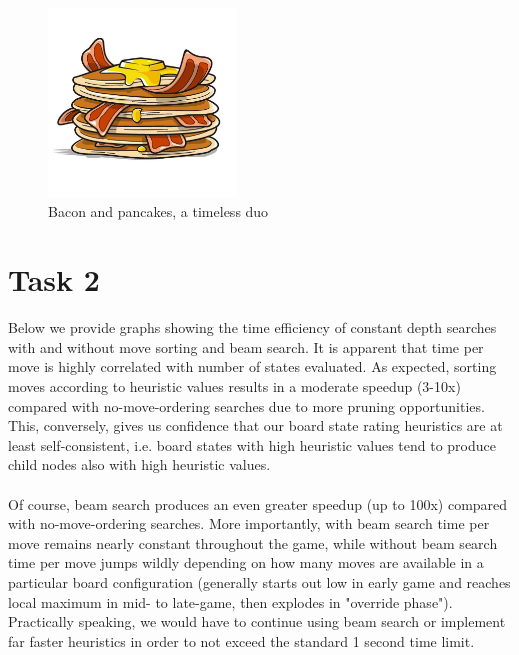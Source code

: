 \documentclass[a4paper,12pt]{article}
\begin{document}
\begin{figure}[H]
    \centering
    \includegraphics[height=5cm]{pictures/assignment4/pancakes_and_bacon.jpg}
    {\caption*{Bacon and pancakes, a timeless duo}}
    \label{fig:pancakes_and_bacon}
\end{figure}

\section{Task 2}
Below we provide graphs showing the time efficiency of constant depth searches with and without move sorting and beam search. It is apparent that time per move is highly correlated with number of states evaluated. As expected, sorting moves according to heuristic values results in a moderate speedup (3-10x) compared with no-move-ordering searches due to more pruning opportunities. This, conversely, gives us confidence that our board state rating heuristics are at least self-consistent, i.e. board states with high heuristic values tend to produce child nodes also with high heuristic values. \\ \\
Of course, beam search produces an even greater speedup (up to 100x) compared with no-move-ordering searches. More importantly, with beam search time per move remains nearly constant throughout the game, while without beam search time per move jumps wildly depending on how many moves are available in a particular board configuration (generally starts out low in early game and reaches local maximum in mid- to late-game, then explodes in "override phase"). Practically speaking, we would have to continue using beam search or implement far faster heuristics in order to not exceed the standard 1 second time limit.





\end{document}
